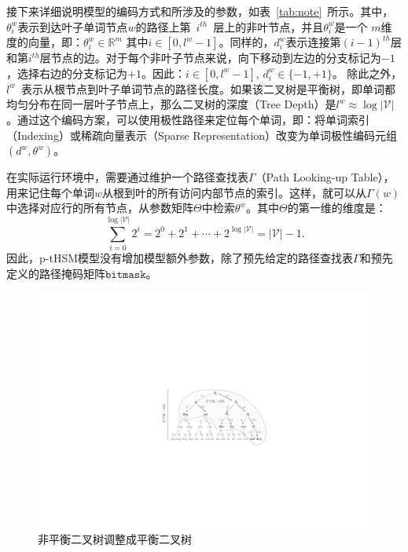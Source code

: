 接下来详细说明模型的编码方式和所涉及的参数，如表~\ref{tab:note}~所示。其中，$\theta_i^w $表示到达叶子单词节点$w$的路径上第~$i^{th}$~层上的非叶节点，并且$\theta_i ^ w$是一个 $m$维度的向量，即：$\theta_i^w \in\mathbb{R}^m $ 其中$ i \in [0, l^w-1] $。同样的，$ d_i^w $表示连接第$(i-1)^{th}$层和第$i^{th}$层节点的边。对于每个非叶子节点来说，向下移动到左边的分支标记为$ -1 $，选择右边的分支标记为$ + 1 $。因此：$i\in[0,l^w-1]$, $d_i^w\in \{-1,+1\}$。 除此之外， $l^w$~表示从根节点到叶子单词节点的路径长度。如果该二叉树是平衡树，即单词都均匀分布在同一层叶子节点上，那么二叉树的深度（Tree Depth）是$l^w\approx \log \mathcal{|V|}$ 。通过这个编码方案，可以使用极性路径来定位每个单词，即：将单词索引（Indexing）或稀疏向量表示（Sparse Representation）改变为单词极性编码元组$(d^w,\theta^w)$。



在实际运行环境中，需要通过维护一个路径查找表$\Gamma$（Path Looking-up Table），用来记住每个单词$ w $从根到叶的所有访问内部节点的索引。这样，就可以从$ \Gamma(w)$中选择对应行的所有节点，从参数矩阵${\Theta} $中检索$ \theta ^ w $。其中${\Theta} $的第一维的维度是：
\begin{equation}\label{equ:sums}
\sum_{i=0}^{\log \mathcal{|V|}}{2^i} =2^0+2^1+\cdots+2^{\log \mathcal{|V|}}= \mathcal{|V|} -1.
\end{equation}
因此，p-tHSM模型没有增加模型额外参数，除了预先给定的路径查找表$\Gamma$和预先定义的路径掩码矩阵$\mathtt{bitmask}$。


\begin{figure}[!t]
  \centering
\includegraphics[width=0.9\linewidth]{./figures/thsm-example-mask.pdf}
\caption{非平衡二叉树调整成平衡二叉树}\label{fig:case_thsm_mask}
\end{figure}


